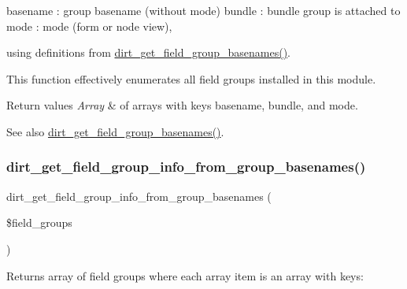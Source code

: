 \textquotesingle{}basename\textquotesingle{} \+: group basename (without mode) \textquotesingle{}bundle\textquotesingle{} \+: bundle group is attached to \textquotesingle{}mode\textquotesingle{} \+: mode (form or node view),

using definitions from \mbox{\hyperlink{dirt_8field__groups_8inc_aebe241946b4cdcfebd57e57dae89dbd1}{dirt\+\_\+get\+\_\+field\+\_\+group\+\_\+basenames()}}.

This function effectively enumerates all field groups installed in this module.


\begin{DoxyRetVals}{Return values}
{\em Array} & of arrays with keys \textquotesingle{}basename\textquotesingle{}, \textquotesingle{}bundle\textquotesingle{}, and \textquotesingle{}mode\textquotesingle{}.\\
\hline
\end{DoxyRetVals}
\begin{DoxySeeAlso}{See also}
\mbox{\hyperlink{dirt_8field__groups_8inc_aebe241946b4cdcfebd57e57dae89dbd1}{dirt\+\_\+get\+\_\+field\+\_\+group\+\_\+basenames()}}. 
\end{DoxySeeAlso}
\mbox{\label{dirt_8field__groups_8inc_a537754b185bac30d8599a5fb2d0055e1}} 
\subsubsection{\texorpdfstring{dirt\+\_\+get\+\_\+field\+\_\+group\+\_\+info\+\_\+from\+\_\+group\+\_\+basenames()}{dirt\_get\_field\_group\_info\_from\_group\_basenames()}}
{\footnotesize\ttfamily dirt\+\_\+get\+\_\+field\+\_\+group\+\_\+info\+\_\+from\+\_\+group\+\_\+basenames (\begin{DoxyParamCaption}\item[{}]{\$field\+\_\+groups }\end{DoxyParamCaption})}

Returns array of field groups where each array item is an array with keys\+:

